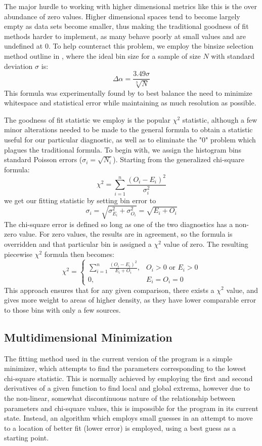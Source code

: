 \documentclass[twocolumn,letterpaper,10pt]{article}
\begin{document}
The major hurdle to working with higher dimensional metrics like this is the over abundance of zero values. Higher dimensional spaces tend to become largely empty as data sets become smaller, thus making the traditional goodness of fit methods harder to implement, as many behave poorly at small values and are undefined at 0. To help counteract this problem, we employ the binsize selection method outline in \citet{binsize}, where the ideal bin size for a sample of size $N$ with standard deviation $\sigma$ is: 
$$
\Delta \alpha=\frac{3.49\sigma}{\sqrt[3]{N}}$$
 This formula was experimentally found by \citet{binsize} to best balance the need to minimize whitespace and statistical error while maintaining as much resolution as possible.

The goodness of fit statistic we employ is the popular $\chi^2$ statistic, although a few minor alterations needed to be made to the general formula to obtain a statistic useful for our particular diagnostic, as well as to eliminate the "0" problem which plagues the traditional formula. To begin with, we assign the histogram bins standard Poisson errors ($\sigma_i=\sqrt{N_i}$). Starting from the generalized chi-square formula:
$$
\chi^2=\sum\limits_{i=1}^n \frac{(O_i-E_i)^2}{\sigma_i^2}
$$
we get our fitting statistic by setting bin error to 
$$
\sigma_i=\sqrt{\sigma_{E_i}^2+\sigma_{O_i}^2}=\sqrt{E_i+O_i}
$$ 
The chi-square error is defined so long as one of the two diagnostics has a non-zero value. For zero values, the results are in agreement, so the formula is overridden and that particular bin is assigned a $\chi^2$ value of zero. The resulting piecewise $\chi^2$ formula then becomes:
$$
\chi^2=
\begin{cases}
\sum\limits_{i=1}^n \frac{(O_i-E_i)^2}{E_i+O_i}, & O_i > 0 \text{ or } E_i > 0 \\
0, & E_i=O_i=0
\end{cases}
$$
This approach ensures that for any given comparison, there exists a $\chi^2$ value, and gives more weight to areas of higher density, as they have lower comparable error to those bins with only a few sources.

\subsection{Multidimensional Minimization}
The fitting method used in the current version of the program is a simple minimizer, which attempts to find the parameters corresponding to the lowest chi-square statistic. This is normally achieved by employing the first and second derivatives of a given function to find local and global extrema, however due to the non-linear, somewhat discontinuous nature of the relationship between parameters and chi-square values, this is impossible for the program in its current state. Instead, an algorithm which employs small guesses in an attempt to move to a location of better fit (lower error) is employed, using a best guess as a starting point. 
\end{document}
